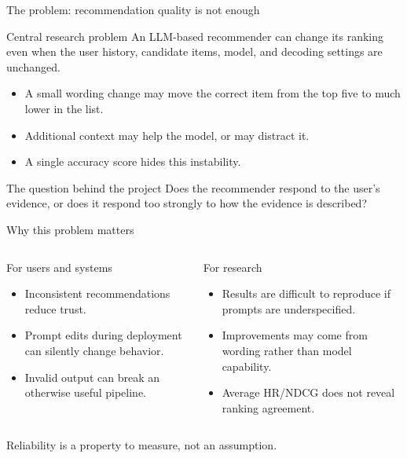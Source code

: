 \documentclass[aspectratio=169,12pt]{beamer}
\begin{document}
\begin{frame}{The problem: recommendation quality is not enough}
\begin{alertblock}{Central research problem}
An LLM-based recommender can change its ranking even when the user history,
candidate items, model, and decoding settings are unchanged.
\end{alertblock}

\vspace{0.4em}
\begin{itemize}
  \item A small wording change may move the correct item from the top five to
        much lower in the list.
  \item Additional context may help the model, or may distract it.
  \item A single accuracy score hides this instability.
\end{itemize}

\begin{block}{The question behind the project}
Does the recommender respond to the user's evidence, or does it respond too
strongly to how the evidence is described?
\end{block}
\end{frame}

\begin{frame}{Why this problem matters}
\begin{columns}[T]
\begin{block}{For users and systems}
\begin{itemize}
  \item Inconsistent recommendations reduce trust.
  \item Prompt edits during deployment can silently change behavior.
  \item Invalid output can break an otherwise useful pipeline.
\end{itemize}
\end{block}

\begin{block}{For research}
\begin{itemize}
  \item Results are difficult to reproduce if prompts are underspecified.
  \item Improvements may come from wording rather than model capability.
  \item Average HR/NDCG does not reveal ranking agreement.
\end{itemize}
\end{block}
\end{columns}

\vspace{0.5em}
\centering
\Large\textcolor{DeepBlue}{Reliability is a property to measure, not an assumption.}
\end{frame}
\end{document}
